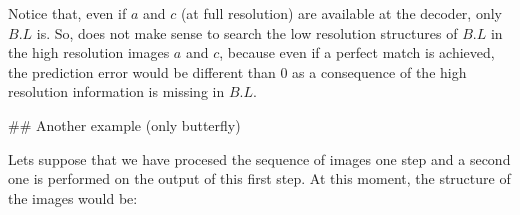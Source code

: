 \begin{Shaded}
\begin{Highlighting}[]
\OperatorTok{=}
\OperatorTok{=}
\OperatorTok{=}
\NormalTok{[A.L] }\OperatorTok{=}\NormalTok{) }
\NormalTok{[A.H] }\OperatorTok{=}
\NormalTok{[B.L] }\OperatorTok{=}\NormalTok{)}
\NormalTok{[B.H] }\OperatorTok{=}
\NormalTok{[C.L] }\OperatorTok{=}\NormalTok{)}
\NormalTok{[C.H] }\OperatorTok{=}
\NormalTok{[B.L]}\OperatorTok{->}\NormalTok{[A.L] }\OperatorTok{=}
\NormalTok{[B_A.H] }\OperatorTok{=}\OperatorTok{->}\NormalTok{[A.L]) }
\NormalTok{[B.L]}\OperatorTok{->}\NormalTok{[C.L] }\OperatorTok{=}
\NormalTok{[B_C.H] }\OperatorTok{=}\OperatorTok{->}\NormalTok{[C.L])}
\NormalTok{[}\OperatorTok{~}\NormalTok{B.H] }\OperatorTok{=}\NormalTok{ [B.H] }\OperatorTok{-}\NormalTok{ [B_A.H]}\OperatorTok{/} \OperatorTok{+}\NormalTok{ [B_C.H]}\OperatorTok{/}
\OperatorTok{~}\OperatorTok{=}\NormalTok{ 2D_DWT([}\OperatorTok{~}\NormalTok{B.H])}
\OperatorTok{=}
\OperatorTok{=}\OperatorTok{~}
\OperatorTok{=}
\end{Highlighting}
\end{Shaded}

Notice that, even if \(a\) and \(c\) (at full resolution) are available
at the decoder, only \(B.L\) is. So, does not make sense to search the
low resolution structures of \(B.L\) in the high resolution images \(a\)
and \(c\), because even if a perfect match is achieved, the prediction
error would be different than \(0\) as a consequence of the high
resolution information is missing in \(B.L\).

    \#\# Another example (only butterfly)

Lets suppose that we have procesed the sequence of images one step and a
second one is performed on the output of this first step. At this
moment, the structure of the images would be:

